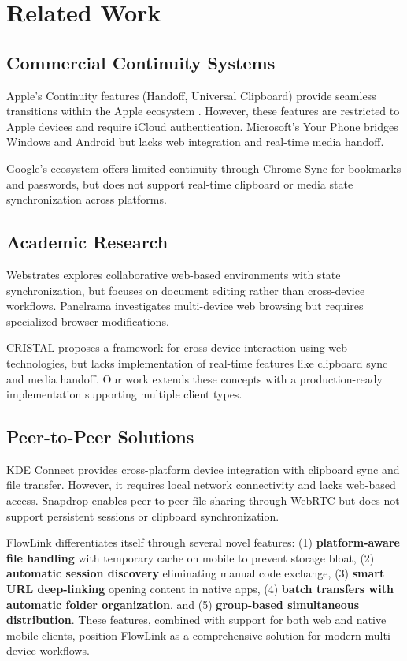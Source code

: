 \documentclass[conference]{IEEEtran}
\begin{document}
\section{Related Work}

\subsection{Commercial Continuity Systems}

Apple's Continuity features (Handoff, Universal Clipboard) provide seamless transitions within the Apple ecosystem \cite{apple_continuity}. However, these features are restricted to Apple devices and require iCloud authentication. Microsoft's Your Phone \cite{microsoft_yourphone} bridges Windows and Android but lacks web integration and real-time media handoff.

Google's ecosystem offers limited continuity through Chrome Sync for bookmarks and passwords, but does not support real-time clipboard or media state synchronization across platforms.

\subsection{Academic Research}

Webstrates \cite{webstrates} explores collaborative web-based environments with state synchronization, but focuses on document editing rather than cross-device workflows. Panelrama \cite{panelrama} investigates multi-device web browsing but requires specialized browser modifications.

CRISTAL \cite{cristal} proposes a framework for cross-device interaction using web technologies, but lacks implementation of real-time features like clipboard sync and media handoff. Our work extends these concepts with a production-ready implementation supporting multiple client types.

\subsection{Peer-to-Peer Solutions}

KDE Connect \cite{kdeconnect} provides cross-platform device integration with clipboard sync and file transfer. However, it requires local network connectivity and lacks web-based access. Snapdrop \cite{snapdrop} enables peer-to-peer file sharing through WebRTC but does not support persistent sessions or clipboard synchronization.

FlowLink differentiates itself through several novel features: (1) \textbf{platform-aware file handling} with temporary cache on mobile to prevent storage bloat, (2) \textbf{automatic session discovery} eliminating manual code exchange, (3) \textbf{smart URL deep-linking} opening content in native apps, (4) \textbf{batch transfers with automatic folder organization}, and (5) \textbf{group-based simultaneous distribution}. These features, combined with support for both web and native mobile clients, position FlowLink as a comprehensive solution for modern multi-device workflows.
\end{document}
